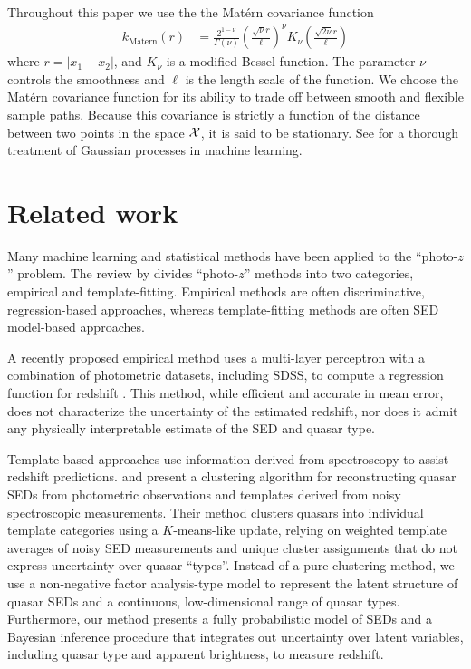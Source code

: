 \documentclass{article} %
\begin{document}
Throughout this paper we use the the Mat\'{e}rn \cite{Matern1986spatial} covariance function
\begin{align}
  k_{\text{Matern}}(r)
    &= \frac{2^{1-\nu}}{\Gamma(\nu)} 
       \left( \frac{\sqrt{\nu} r}{\ell} \right) ^\nu
       K_\nu\left( \frac{\sqrt{2\nu} r}{\ell}\right)
\end{align}
where ${r = |x_1 - x_2|}$, and $K_\nu$ is a modified Bessel function.  The parameter $\nu$ controls the smoothness and $\ell$ is the length scale of the function.  
We choose the Mat\'{e}rn covariance function for its ability to trade off between smooth and flexible sample paths.  
Because this covariance is strictly a function of the distance between two points in the space $\mathcal{X}$, it is said to be stationary. 
See \cite{rasmussen2006gaussian} for a thorough treatment of Gaussian processes in machine learning. 



\section{Related work}
\label{sec:related}
Many machine learning and statistical methods have been applied to the ``photo-$z$'' problem. The review by \cite{walcher2011fitting} divides ``photo-$z$'' methods into two categories, empirical and template-fitting.  Empirical methods are often discriminative, regression-based approaches, whereas template-fitting methods are often SED model-based approaches.  

A recently proposed empirical method uses a multi-layer perceptron with a combination of photometric datasets, including SDSS, 
to compute a regression function for redshift \cite{brescia2013photometric}. 
This method, while efficient and accurate in mean error, does not characterize the uncertainty of the estimated redshift, nor does it admit any physically interpretable estimate of the SED and quasar type.  

Template-based approaches use information derived from spectroscopy to assist redshift predictions.  
\cite{budavari2001photometric} and \cite{richards2001photometric} present a clustering algorithm for reconstructing quasar SEDs from photometric observations and templates derived from noisy spectroscopic measurements.  
Their method clusters quasars into individual template categories using a $K$-means-like update, relying on weighted template averages of noisy SED measurements and unique cluster assignments that do not express uncertainty over quasar ``types''. 
Instead of a pure clustering method, we use a non-negative factor analysis-type model to represent the latent structure of quasar SEDs and a continuous, low-dimensional range of quasar types.  
Furthermore, our method presents a fully probabilistic model of SEDs and a Bayesian inference procedure that integrates out uncertainty over latent variables, including quasar type and apparent brightness, to measure redshift.    
\end{document}
